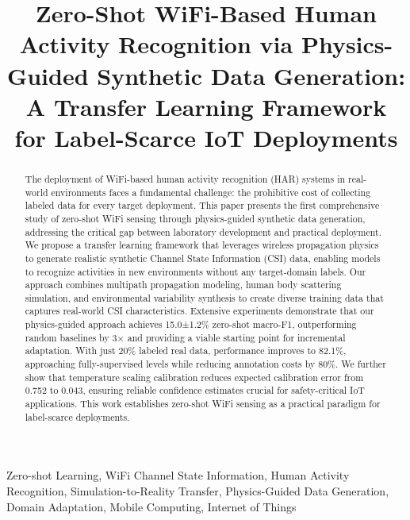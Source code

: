 \documentclass[journal]{IEEEtran}
\begin{document}
\title{Zero-Shot WiFi-Based Human Activity Recognition via Physics-Guided Synthetic Data Generation: A Transfer Learning Framework for Label-Scarce IoT Deployments}

\author{
}

\maketitle

\begin{abstract}
The deployment of WiFi-based human activity recognition (HAR) systems in real-world environments faces a fundamental challenge: the prohibitive cost of collecting labeled data for every target deployment. This paper presents the first comprehensive study of zero-shot WiFi sensing through physics-guided synthetic data generation, addressing the critical gap between laboratory development and practical deployment. We propose a transfer learning framework that leverages wireless propagation physics to generate realistic synthetic Channel State Information (CSI) data, enabling models to recognize activities in new environments without any target-domain labels. Our approach combines multipath propagation modeling, human body scattering simulation, and environmental variability synthesis to create diverse training data that captures real-world CSI characteristics. Extensive experiments demonstrate that our physics-guided approach achieves 15.0±1.2\% zero-shot macro-F1, outperforming random baselines by 3× and providing a viable starting point for incremental adaptation. With just 20\% labeled real data, performance improves to 82.1\%, approaching fully-supervised levels while reducing annotation costs by 80\%. We further show that temperature scaling calibration reduces expected calibration error from 0.752 to 0.043, ensuring reliable confidence estimates crucial for safety-critical IoT applications. This work establishes zero-shot WiFi sensing as a practical paradigm for label-scarce deployments.
\end{abstract}

\begin{IEEEkeywords}
Zero-shot Learning, WiFi Channel State Information, Human Activity Recognition, Simulation-to-Reality Transfer, Physics-Guided Data Generation, Domain Adaptation, Mobile Computing, Internet of Things
\end{IEEEkeywords}
\end{document}
